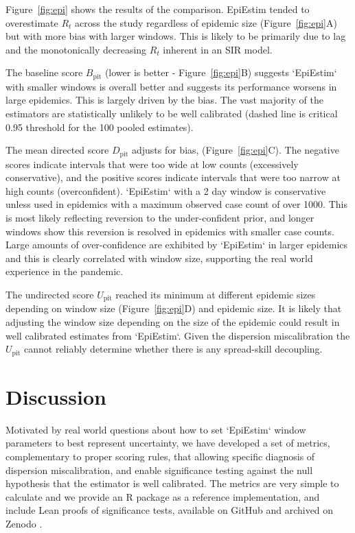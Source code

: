 \documentclass[twoside,11pt,hyphens]{article}
\newcommand{\Bpit}{B_{\mathrm{pit}}}
\newcommand{\Dpit}{D_{\mathrm{pit}}}
\newcommand{\Upit}{U_{\mathrm{pit}}}
\begin{document}
Figure~\ref{fig:epi} shows the results of the comparison. EpiEstim tended to overestimate $R_t$ across the study
regardless of epidemic size (Figure~\ref{fig:epi}A) but with more bias with larger windows. This is likely to be primarily due to lag and the monotonically decreasing $R_t$ inherent in an SIR model.

The baseline score $\Bpit$ (lower is better - Figure~\ref{fig:epi}B) suggests `EpiEstim` with smaller windows is overall better and suggests its performance worsens in large epidemics. This is largely driven by the bias. The vast majority of the estimators are statistically unlikely to be well calibrated (dashed line is critical 0.95 threshold for the 100 pooled estimates).

The mean directed score $\Dpit$ adjusts for bias, (Figure~\ref{fig:epi}C). The negative scores indicate intervals that were too wide at low counts (excessively conservative), and the positive scores indicate intervals that were too narrow at high counts (overconfident). `EpiEstim` with a 2 day window is conservative unless used in epidemics with a maximum observed case count of over 1000. This is most likely reflecting reversion to the under-confident prior, and longer windows show this reversion is resolved in epidemics with smaller case counts. Large amounts of over-confidence are exhibited by `EpiEstim` in larger epidemics and this is clearly correlated with window size, supporting the real world experience in the pandemic.

The undirected score $\Upit$ reached its minimum at different epidemic sizes depending on window size (Figure~\ref{fig:epi}D) and epidemic size. It is likely that adjusting the window size depending on the size of the epidemic could result in well calibrated estimates from `EpiEstim`. Given the dispersion miscalibration the $\Upit$ cannot reliably determine whether there is any spread-skill decoupling.

\section{Discussion}

Motivated by real world questions about how to set `EpiEstim` window parameters to best represent uncertainty, we have developed a set of metrics, complementary to proper scoring rules, that allowing specific diagnosis of dispersion miscalibration, and enable significance testing against the null hypothesis that the estimator is well calibrated. The metrics are very simple to calculate and we provide an R package as a reference implementation, and include Lean proofs of significance tests, available on GitHub and archived on Zenodo \citep{challen2026}.
\end{document}
